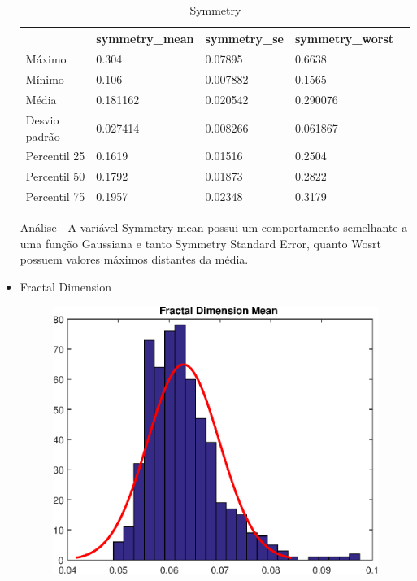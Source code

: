 \documentclass[11pt,a4paper]{article}
\numberwithin{equation}{section}
\begin{document}
\begin{itemize}
\begin{table}[H]
\centering
\caption{Symmetry}
\label{my-label}
\begin{tabular}{lllll} \hline
              & symmetry\_mean & symmetry\_se & symmetry\_worst &  \\ \hline
Máximo        & 0.304          & 0.07895      & 0.6638          &  \\
Mínimo        & 0.106          & 0.007882     & 0.1565          &  \\
Média         & 0.181162       & 0.020542     & 0.290076        &  \\
Desvio padrão & 0.027414       & 0.008266     & 0.061867        &  \\
Percentil 25  & 0.1619         & 0.01516      & 0.2504          &  \\
Percentil 50  & 0.1792         & 0.01873      & 0.2822          &  \\
Percentil 75  & 0.1957         & 0.02348      & 0.3179          &  \\ \hline
\end{tabular}
\end{table}

Análise - A variável Symmetry mean possui um comportamento semelhante  a uma função Gaussiana e tanto Symmetry Standard Error, quanto Wosrt possuem valores máximos distantes da média.

\item Fractal Dimension
\begin{figure}[H]
\centering
  \includegraphics[width=.4\linewidth]{./img/fractal_dimension_mean}
  \label{fig:test1}
\end{figure}%


\end{itemize}
\end{document}
